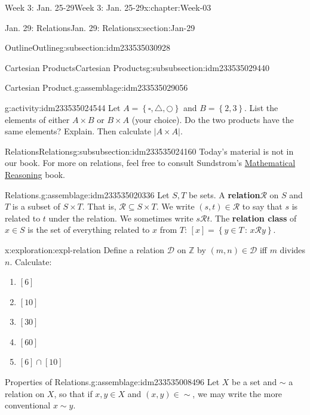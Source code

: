 \documentclass[oneside,10pt,]{book}
\newcommand{\terminology}[1]{\textbf{#1}}
\numberwithin{equation}{section}
\newcommand{\set}[1]{\left\{ {#1} \right\}}
\newcommand{\setof}[2]{{\left\{#1\,\colon\,#2\right\}}}
\def\Z{{\mathbb Z}}
\newcommand{\Z}{\mathbb Z}
\newcommand{\card}[1]{\left| #1 \right|}
\begin{document}
\begin{chapterptx}{Week 3: Jan. 25-29}{}{Week 3: Jan. 25-29}{}{}{x:chapter:Week-03}
\begin{sectionptx}{Jan. 29: Relations}{}{Jan. 29: Relations}{}{}{x:section:Jan-29}
\begin{subsectionptx}{Outline}{}{Outline}{}{}{g:subsection:idm233535030928}
\begin{subsubsectionptx}{Cartesian Products}{}{Cartesian Products}{}{}{g:subsubsection:idm233535029440}
\begin{assemblage}{Cartesian Product.}{g:assemblage:idm233535029056}
\end{assemblage}
\begin{activity}{}{g:activity:idm233535024544}%
Let \(A = \set{\square,\triangle,\bigcirc}\) and \(B=\set{2,3}\). List the elements of either \(A\times B\) or \(B\times A\) (your choice). Do the two products have the same elements? Explain. Then calculate \(\card{A\times A}\).%
\end{activity}%
\end{subsubsectionptx}
%
%
\typeout{************************************************}
\typeout{************************************************}
%
\begin{subsubsectionptx}{Relations}{}{Relations}{}{}{g:subsubsection:idm233535024160}
Today's material is not in our book. For more on relations, feel free to consult Sundstrom's \href{https://www.tedsundstrom.com/mathematical-reasoning-3}{Mathematical Reasoning} book.%
\begin{assemblage}{Relations.}{g:assemblage:idm233535020336}%
Let \(S,T\) be sets. A \terminology{relation}\(\mathcal{R}\) on \(S\) and \(T\) is a subset of \(S\times T\). That is, \(\mathcal{R}\subseteq S\times T\). We write \((s,t)\in \mathcal{R}\) to say that \(s\) is related to \(t\) under the relation. We sometimes write \(s \mathcal{R} t\). The \terminology{relation class} of \(x\in S\) is the set of everything related to \(x\) from \(T\): \([x] = \setof{y\in T}{x\mathcal{R}y}\).%
\end{assemblage}
\begin{exploration}{}{x:exploration:expl-relation}%
Define a relation \(\mathcal{D}\) on \(\Z\) by \((m,n)\in \mathcal{D}\) iff \(m\) divides \(n\). Calculate:%
%
\begin{enumerate}
\item{}\(\displaystyle [6]\)%
\item{}\(\displaystyle [10]\)%
\item{}\(\displaystyle [30]\)%
\item{}\(\displaystyle [60]\)%
\item{}\(\displaystyle [6]\cap[10]\)%
\end{enumerate}
\end{exploration}%
\begin{assemblage}{Properties of Relations.}{g:assemblage:idm233535008496}%
Let \(X\) be a set and \(\sim\) a relation on \(X\), so that if \(x,y\in X\) and \((x,y)\in \sim\), we may write the more conventional \(x\sim y\). %
\begin{enumerate}

\end{enumerate}
\end{assemblage}
\end{subsubsectionptx}
\end{subsectionptx}
\end{sectionptx}
\end{chapterptx}
\end{document}
